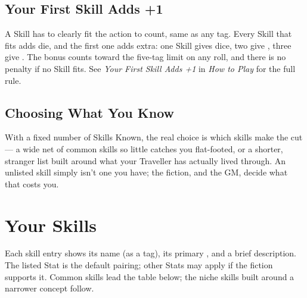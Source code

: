 \subsection*{Your First Skill Adds +1}
A Skill has to clearly fit the action to count, same as any tag. Every
Skill that fits adds  die, and the first one adds 
extra: one Skill gives  dice, two give , three give
. The bonus counts toward the five-tag limit on any roll, and
there is no penalty if no Skill fits. See \emph{Your First Skill Adds +1}
in \emph{How to Play} for the full rule.

\subsection*{Choosing What You Know}
With a fixed number of Skills Known, the real choice is which skills
make the cut --- a wide net of common skills so little catches you
flat-footed, or a shorter, stranger list built around what your
Traveller has actually lived through. An unlisted skill simply isn't
one you have; the fiction, and the GM, decide what that costs you.

\section{Your Skills}

Each skill entry shows its name (as a tag), its primary ,
and a brief description. The listed Stat is the default pairing; other
Stats may apply if the fiction supports it. Common skills lead the table
below; the niche skills built around a narrower concept follow.


